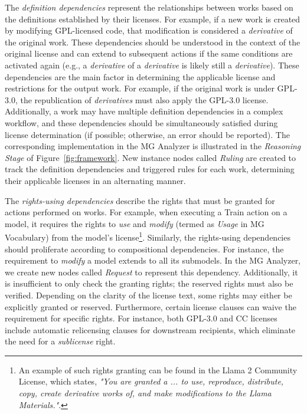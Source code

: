 The \emph{definition dependencies} represent the relationships between works based on the definitions established by their licenses. 
For example, if a new work is created by modifying GPL-licensed code, that modification is considered a \emph{derivative} of the original work.
These dependencies should be understood in the context of the original license and can extend to subsequent actions if the same conditions are activated again (e.g., a \emph{derivative} of a \emph{derivative} is likely still a \emph{derivative}).
These dependencies are the main factor in determining the applicable license and restrictions for the output work. 
For example, if the original work is under GPL-3.0, the republication of \emph{derivatives} must also apply the GPL-3.0 license.
Additionally, a work may have multiple definition dependencies in a complex workflow, and these dependencies should be simultaneously satisfied during license determination (if possible; otherwise, an error should be reported).
The corresponding implementation in the MG Analyzer is illustrated in the \emph{Reasoning Stage} of Figure~\ref{fig:framework}. 
New instance nodes called \emph{Ruling} are created to track the definition dependencies and triggered rules for each work, determining their applicable licenses in an alternating manner.

The \emph{rights-using dependencies} describe the rights that must be granted for actions performed on works. 
For example, when executing a Train action on a model, it requires the rights to \emph{use} and \emph{modify} (termed as \emph{Usage} in MG Vocabulary) from the model's license\footnote{An example of such rights granting can be found in the Llama 2 Community License, which states, \emph{"You are granted a ... to use, reproduce, distribute, copy, create derivative works of, and make modifications to the Llama Materials."}.}.
Similarly, the rights-using dependencies should proliferate according to compositional dependencies.
For instance, the requirement to \emph{modify} a model extends to all its submodels.
In the MG Analyzer, we create new nodes called \emph{Request} to represent this dependency.
Additionally, it is insufficient to only check the granting rights; the reserved rights must also be verified. 
Depending on the clarity of the license text, some rights may either be explicitly granted or reserved.
Furthermore, certain license clauses can waive the requirement for specific rights. 
For instance, both GPL-3.0 and CC licenses include automatic relicensing clauses for downstream recipients, which eliminate the need for a \emph{sublicense} right.

